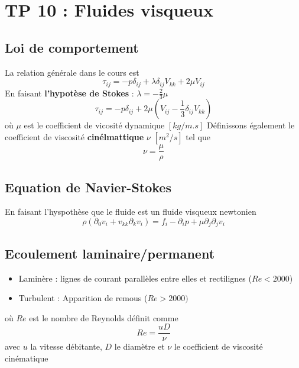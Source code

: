 
\section*{TP 10 : Fluides visqueux}
\subsection*{Loi de comportement}
La relation générale dans le cours est
\begin{equation}
	\tau _{ij} = -p\delta _{ij}+\lambda \delta _{ij} V_{kk} +2\mu V_{ij}
\end{equation}
En faisant \textbf{l'hypotèse de Stokes} : $\lambda = -\frac{2}{3}\mu$
\begin{equation}
	\tau _{ij} = -p\delta _{ij}+2\mu (V_{ij} -\frac{1}{3} \delta_{ij}V_{kk})
\end{equation}
où $\mu$ est le coefficient de vicosité dynamique $[kg/m.s]$ 
Définissons également le coefficient de viscosité \textbf{cinélmattique} $\nu$ $[m^2/s]$ tel que 
\begin{equation}
	\nu = \frac{\mu}{\rho}
\end{equation}

\subsection*{Equation de Navier-Stokes}
En faisant l'hyspothèse que le fluide est un fluide visqueux newtonien
\begin{equation}
	\rho (\partial _0 v_i + v_{kk}\partial _k v_i) = f_i-\partial _i p + \mu \partial _j \partial _j v_i
\end{equation}

\subsection*{Ecoulement laminaire/permanent}
\begin{itemize}
	\item Laminère : lignes de courant parallèles entre elles et rectilignes ($Re < 2000$)
	\item Turbulent : Apparition de remous ($Re > 2000)$
\end{itemize}
où $Re$ est le nombre de Reynolds définit comme
\begin{equation}
	Re = \frac{uD}{\nu}
\end{equation}
avec $u$ la vitesse débitante, $D$ le diamètre et $\nu$ le coefficient de viscosité cinématique

